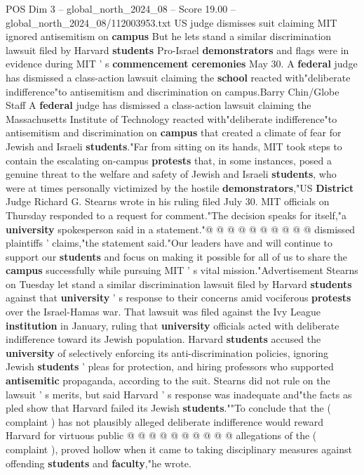 \begin{textsample}{POS Dim 3 – global\_north\_2024\_08 – Score 19.00 – global\_north\_2024\_08/112003953.txt}  \label{ex:f3_pos_140}
US judge dismisses suit claiming MIT ignored antisemitism on \textbf{campus} But he lets stand a similar discrimination lawsuit filed by Harvard \textbf{students} Pro-Israel \textbf{demonstrators} and flags were in evidence during MIT ' s \textbf{commencement} \textbf{ceremonies} May 30.
A \textbf{federal} judge has dismissed a class-action lawsuit claiming the \textbf{school} reacted with"deliberate indifference"to antisemitism and discrimination on campus.Barry Chin/Globe Staff A \textbf{federal} judge has dismissed a class-action lawsuit claiming the Massachusetts Institute of Technology reacted with"deliberate indifference"to antisemitism and discrimination on \textbf{campus} that created a climate of fear for Jewish and Israeli \textbf{students}."Far from sitting on its hands, MIT took steps to contain the escalating on-campus \textbf{protests} that, in some instances, posed a genuine threat to the welfare and safety of Jewish and Israeli \textbf{students}, who were at times personally victimized by the hostile \textbf{demonstrators},"US \textbf{District} Judge Richard G.
Stearns wrote in his ruling filed July 30.
MIT officials on Thursday responded to a request for comment."The decision speaks for itself,"a \textbf{university} spokesperson said in a statement."@ @ @ @ @ @ @ @ @ @ dismissed plaintiffs ' claims,"the statement said."Our leaders have and will continue to support our \textbf{students} and focus on making it possible for all of us to share the \textbf{campus} successfully while pursuing MIT ' s vital mission."Advertisement Stearns on Tuesday let stand a similar discrimination lawsuit filed by Harvard \textbf{students} against that \textbf{university} ' s response to their concerns amid vociferous \textbf{protests} over the Israel-Hamas war.
That lawsuit was filed against the Ivy League \textbf{institution} in January, ruling that \textbf{university} officials acted with deliberate indifference toward its Jewish population.
Harvard \textbf{students} accused the \textbf{university} of selectively enforcing its anti-discrimination policies, ignoring Jewish \textbf{students} ' pleas for protection, and hiring professors who supported \textbf{antisemitic} propaganda, according to the suit.
Stearns did not rule on the lawsuit ' s merits, but said Harvard ' s response was inadequate and"the facts as pled show that Harvard failed its Jewish \textbf{students}.""To conclude that the ( complaint ) has not plausibly alleged deliberate indifference would reward Harvard for virtuous public @ @ @ @ @ @ @ @ @ @ allegations of the ( complaint ), proved hollow when it came to taking disciplinary measures against offending \textbf{students} and \textbf{faculty},"he wrote.

\end{textsample}
